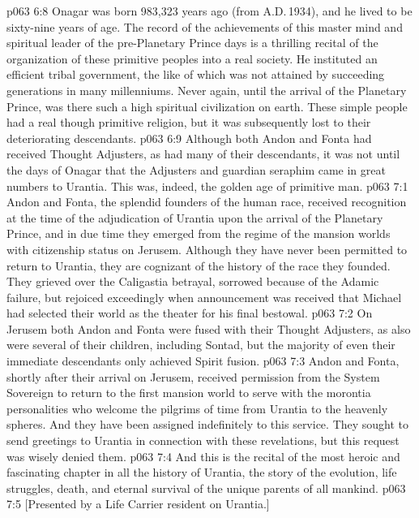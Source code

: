 \vs p063 6:8 Onagar was born 983,323 years ago (from A.D.\,1934), and he lived to be sixty\hyp{}nine years of age. The record of the achievements of this master mind and spiritual leader of the pre\hyp{}Planetary Prince days is a thrilling recital of the organization of these primitive peoples into a real society. He instituted an efficient tribal government, the like of which was not attained by succeeding generations in many millenniums. Never again, until the arrival of the Planetary Prince, was there such a high spiritual civilization on earth. These simple people had a real though primitive religion, but it was subsequently lost to their deteriorating descendants.
\vs p063 6:9 Although both Andon and Fonta had received Thought Adjusters, as had many of their descendants, it was not until the days of Onagar that the Adjusters and guardian seraphim came in great numbers to Urantia. This was, indeed, the golden age of primitive man.
\vs p063 7:1 Andon and Fonta, the splendid founders of the human race, received recognition at the time of the adjudication of Urantia upon the arrival of the Planetary Prince, and in due time they emerged from the regime of the mansion worlds with citizenship status on Jerusem. Although they have never been permitted to return to Urantia, they are cognizant of the history of the race they founded. They grieved over the Caligastia betrayal, sorrowed because of the Adamic failure, but rejoiced exceedingly when announcement was received that Michael had selected their world as the theater for his final bestowal.
\vs p063 7:2 On Jerusem both Andon and Fonta were fused with their Thought Adjusters, as also were several of their children, including Sontad, but the majority of even their immediate descendants only achieved Spirit fusion.
\vs p063 7:3 Andon and Fonta, shortly after their arrival on Jerusem, received permission from the System Sovereign to return to the first mansion world to serve with the morontia personalities who welcome the pilgrims of time from Urantia to the heavenly spheres. And they have been assigned indefinitely to this service. They sought to send greetings to Urantia in connection with these revelations, but this request was wisely denied them.
\vs p063 7:4 \pc And this is the recital of the most heroic and fascinating chapter in all the history of Urantia, the story of the evolution, life struggles, death, and eternal survival of the unique parents of all mankind.
\vsetoff
\vs p063 7:5 [Presented by a Life Carrier resident on Urantia.]
